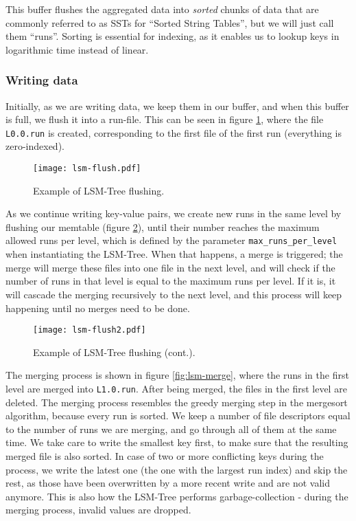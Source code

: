 This buffer flushes the aggregated data into \textit{sorted} chunks of data that are commonly referred to as SSTs for ``Sorted String Tables'', but we will just call them ``runs''.
Sorting is essential for indexing, as it enables us to lookup keys in logarithmic time instead of linear.

\subsubsection{Writing data}

Initially, as we are writing data, we keep them in our buffer, and when this buffer is full, we flush it into a run-file. This can be seen in figure \ref{fig:lsm-flush}, where the file \verb"L0.0.run" is created, corresponding to the first file of the first run (everything is zero-indexed).

\begin{figure}[h]
    \centering
    \texttt{[image: lsm-flush.pdf]}
    \caption{Example of LSM-Tree flushing.}
    \label{fig:lsm-flush}
\end{figure}

As we continue writing key-value pairs, we create new runs in the same level by flushing our memtable (figure \ref{fig:lsm-flush2}), until their number reaches the maximum allowed runs per level, which is defined by the parameter \verb"max_runs_per_level" when instantiating the LSM-Tree. When that happens, a merge is triggered; the merge will merge these files into one file in the next level, and will check if the number of runs in that level is equal to the maximum runs per level. If it is, it will cascade the merging recursively to the next level, and this process will keep happening until no merges need to be done.

\begin{figure}[h]
    \centering
    \texttt{[image: lsm-flush2.pdf]}
    \caption{Example of LSM-Tree flushing (cont.).}
    \label{fig:lsm-flush2}
\end{figure}

The merging process is shown in figure \ref{fig:lsm-merge}, where the runs in the first level are merged into \verb"L1.0.run". After being merged, the files in the first level are deleted.
The merging process resembles the greedy merging step in the mergesort algorithm, because every run is sorted. We keep a number of file descriptors equal to the number of runs we are merging, and go through all of them at the same time. We take care to write the smallest key first, to make sure that the resulting merged file is also sorted. In case of two or more conflicting keys during the process, we write the latest one (the one with the largest run index) and skip the rest, as those have been overwritten by a more recent write and are not valid anymore. This is also how the LSM-Tree performs garbage-collection - during the merging process, invalid values are dropped.

